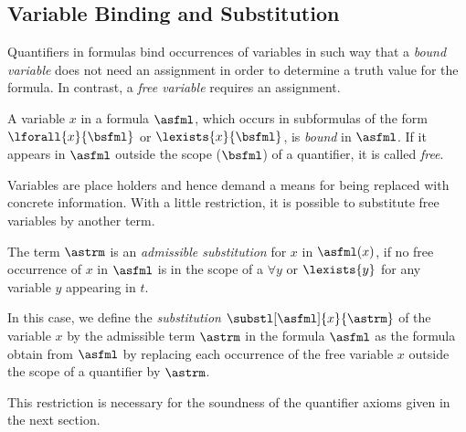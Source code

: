 
        \subsection{Variable Binding and Substitution}
            \label{sec:FOL-variable-binding}

            Quantifiers in formulas bind occurrences of variables in such way that a \emph{bound variable} does not need an assignment in order to determine a truth value for the formula.
            In contrast, a \emph{free variable} requires an assignment.


            \begin{definition}
                A variable $x$ in a formula $\asfml$, which occurs in subformulas of the form $\lforall{x}{\bsfml}$ or $\lexists{x}{\bsfml}$, is \emph{bound} in $\asfml$.
                If it appears in $\asfml$ outside the scope ($\bsfml$) of a quantifier, it is called \emph{free}.
            \end{definition}

            Variables are place holders and hence demand a means for being replaced with concrete information. With a little restriction, it is possible to substitute free variables by another term.

            \begin{definition}
                The term $\astrm$ is an \emph{admissible substitution} for $x$ in $\asfml(x)$, if no free occurrence of $x$ in $\asfml$ is in the scope of a $\forall{y}$ or $\lexists{y}$ for any variable $y$ appearing in $t$.

                In this case, we define the \emph{substitution} $\substl[\asfml]{x}{\astrm}$ of the variable $x$ by the admissible term $\astrm$ in the formula $\asfml$ as the formula obtain from $\asfml$ by replacing each occurrence of the free variable $x$ outside the scope of a quantifier by $\astrm$.
            \end{definition}

            This restriction is necessary for the soundness of the quantifier axioms given in the next section.

